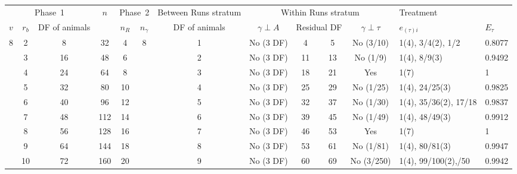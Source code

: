 \documentclass[a4paper,11pt]{article}
\begin{document}
\begin{landscape}
\begin{tabular}[t]{|c|c|c|c|c|c|c|c|c|c|c|p{1in}|p{0.4in}|} \hline
\multicolumn{3}{|c|}{Phase~1}  & $n$  & \multicolumn{2}{c|}{Phase~2} & Between Runs stratum  & \multicolumn{4}{c|}{Within Runs stratum} & \multicolumn{2}{p{1.4in}|}{Treatment} \\ \cline{1-3} \cline{5-6}\cline{7-13}
$v$ & $r_b$ & DF of animals &  & $n_R$ & $n_\gamma$ & DF of animals &  $\gamma \perp A$ & \multicolumn{2}{c|}{Residual DF} & $\gamma \perp \tau$ & $e_{(\tau)i}$ &$E_\tau$\\ \hline
8 & 2 & 8 & 32 & 4 & 8 & 1 & No (3 DF) & 4 & 5 & No (3/10) & 1(4), 3/4(2), 1/2 & 0.8077 \\ \hline 
 & 3 & 16 & 48 & 6 &  & 2 & No (3 DF) & 11 & 13 & No (1/9) & 1(4), 8/9(3) & 0.9492 \\ \hline 
 & 4 & 24 & 64 & 8 &  & 3 & No (3 DF) & 18 & 21 & Yes & 1(7) & 1 \\ \hline 
 & 5 & 32 & 80 & 10 &  & 4 & No (3 DF) & 25 & 29 & No (1/25) & 1(4), 24/25(3)  & 0.9825 \\ \hline 
 & 6 & 40 & 96 & 12 &  & 5 & No (3 DF) & 32 & 37 & No (1/30) & 1(4), 35/36(2), 17/18 & 0.9837 \\ \hline 
 & 7 & 48 & 112 & 14 &  & 6 & No (3 DF) & 39 & 45 & No (1/49) & 1(4), 48/49(3)  & 0.9912 \\ \hline 
 & 8 & 56 & 128 & 16 &  & 7 & No (3 DF) & 46 & 53 & Yes & 1(7) & 1 \\ \hline 
 & 9 & 64 & 144 & 18 &  & 8 & No (3 DF) & 53 & 61 & No (1/81) & 1(4), 80/81(3) & 0.9947 \\ \hline 
 & 10 & 72 & 160 & 20 &  & 9 & No (3 DF) & 60 & 69 & No (3/250) & 1(4), 99/100(2),\newline 49/50 & 0.9942 \\ \hline 
\end{tabular}
\end{landscape}


\begin{landscape}



\end{landscape}
\end{document}
